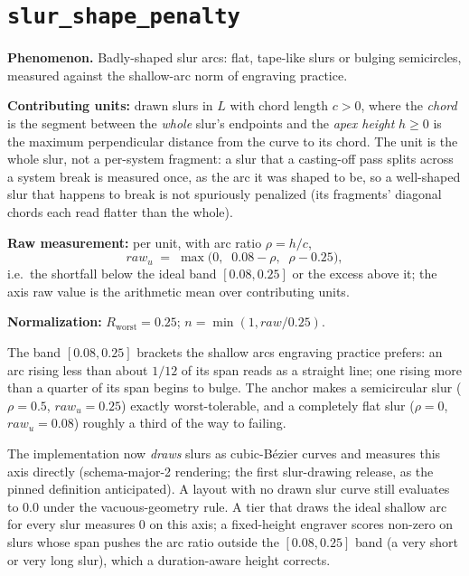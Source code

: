 \documentclass[11pt,letterpaper]{report}
\newcounter{requirement}[chapter]
\begin{document}
\section{\texttt{slur\_shape\_penalty}}
\label{sec:metrics:slur}

\textbf{Phenomenon.} Badly-shaped slur arcs: flat, tape-like slurs or
bulging semicircles, measured against the shallow-arc norm of engraving
practice.

\begin{requirement}
\label{req:qmc:slur}
\textbf{Contributing units:} drawn slurs in $L$ with chord length
$c > 0$, where the \emph{chord} is the segment between the \emph{whole}
slur's endpoints and the \emph{apex height} $h \ge 0$ is the maximum
perpendicular distance from the curve to its chord. The unit is the whole
slur, not a per-system fragment: a slur that a casting-off pass splits
across a system break is measured once, as the arc it was shaped to be, so
a well-shaped slur that happens to break is not spuriously penalized (its
fragments' diagonal chords each read flatter than the whole).

\textbf{Raw measurement:} per unit, with arc ratio $\rho = h / c$,
\[
  \mathit{raw}_u \;=\; \max\bigl(0,\;\; 0.08 - \rho,\;\; \rho - 0.25\bigr),
\]
i.e.\ the shortfall below the ideal band $[0.08, 0.25]$ or the excess
above it; the axis raw value is the arithmetic mean over contributing
units.

\textbf{Normalization:} $R_{\mathrm{worst}} = 0.25$;
$n = \min(1, \mathit{raw} / 0.25)$.
\end{requirement}

\begin{rationale}
The band $[0.08, 0.25]$ brackets the shallow arcs engraving practice
prefers: an arc rising less than about $1/12$ of its span reads as a
straight line; one rising more than a quarter of its span begins to bulge.
The anchor makes a semicircular slur ($\rho = 0.5$, $\mathit{raw}_u =
0.25$) exactly worst-tolerable, and a completely flat slur ($\rho = 0$,
$\mathit{raw}_u = 0.08$) roughly a third of the way to failing.

The implementation now \emph{draws} slurs as cubic-B\'ezier curves and
measures this axis directly (schema-major-2 rendering; the first
slur-drawing release, as the pinned definition anticipated). A layout with
no drawn slur curve still evaluates to $0.0$ under the vacuous-geometry
rule. A tier that draws the ideal shallow arc for every slur measures $0$
on this axis; a fixed-height engraver scores non-zero on slurs whose span
pushes the arc ratio outside the $[0.08, 0.25]$ band (a very short or very
long slur), which a duration-aware height corrects.
\end{rationale}
\end{document}

